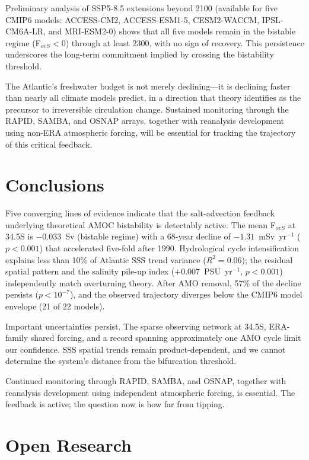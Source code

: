 \documentclass{agujournal2019}
\begin{document}
Preliminary analysis of SSP5-8.5 extensions beyond 2100 (available for five CMIP6 models: ACCESS-CM2, ACCESS-ESM1-5, CESM2-WACCM, IPSL-CM6A-LR, and MRI-ESM2-0) shows that all five models remain in the bistable regime (F$_{ovS} < 0$) through at least 2300, with no sign of recovery. This persistence underscores the long-term commitment implied by crossing the bistability threshold.

The Atlantic's freshwater budget is not merely declining---it is declining faster than nearly all climate models predict, in a direction that theory identifies as the precursor to irreversible circulation change. Sustained monitoring through the RAPID, SAMBA, and OSNAP arrays, together with reanalysis development using non-ERA atmospheric forcing, will be essential for tracking the trajectory of this critical feedback.


\section{Conclusions}

Five converging lines of evidence indicate that the salt-advection feedback underlying theoretical AMOC bistability is detectably active. The mean F$_{ovS}$ at 34.5\textdegree S is $-0.033$~Sv (bistable regime) with a 68-year decline of $-1.31$~mSv~yr$^{-1}$ ($p < 0.001$) that accelerated five-fold after 1990. Hydrological cycle intensification explains less than 10\% of Atlantic SSS trend variance ($R^2 = 0.06$); the residual spatial pattern and the salinity pile-up index ($+0.007$~PSU~yr$^{-1}$, $p < 0.001$) independently match overturning theory. After AMO removal, 57\% of the decline persists ($p < 10^{-7}$), and the observed trajectory diverges below the CMIP6 model envelope (21 of 22 models).

Important uncertainties persist. The sparse observing network at 34.5\textdegree S, ERA-family shared forcing, and a record spanning approximately one AMO cycle limit our confidence. SSS spatial trends remain product-dependent, and we cannot determine the system's distance from the bifurcation threshold.

Continued monitoring through RAPID, SAMBA, and OSNAP, together with reanalysis development using independent atmospheric forcing, is essential. The feedback is active; the question now is how far from tipping.


\section*{Open Research}
\end{document}
